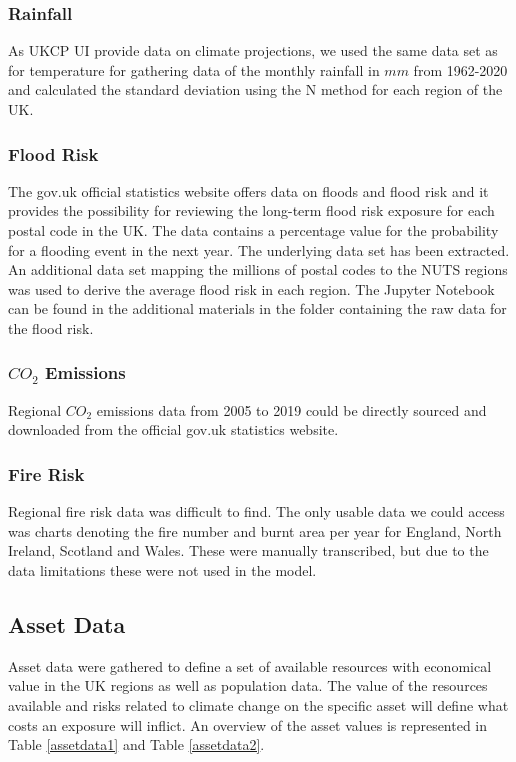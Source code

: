 \documentclass[10pt,a4paper]{article}
\begin{document}
\subsubsection{Rainfall}
As UKCP UI provide data on climate projections, we used the same data set as for temperature for gathering data of the monthly rainfall in $mm$ from 1962-2020 and calculated the standard deviation using the N method for each region of the UK. \cite{uk}
\subsubsection{Flood Risk}
The gov.uk official statistics website offers data on floods and flood risk and it provides the possibility for reviewing the long-term flood risk exposure for each postal code in the UK. The data contains a percentage value for the probability for a flooding event in the next year. The underlying data set has been extracted. An additional data set mapping the millions of postal codes to the NUTS regions was used to derive the average flood risk in each region. The Jupyter Notebook can be found in the additional materials in the folder containing the raw data for the flood risk. \cite{open,postcode}
\subsubsection{$CO_2$ Emissions}
Regional $CO_2$ emissions data from 2005 to 2019 could be directly sourced and downloaded from the official gov.uk statistics website. \cite{uk,ukc}
\subsubsection{Fire Risk}
Regional fire risk data was difficult to find. The only usable data we could access was charts denoting the fire number and burnt area per year for England, North Ireland, Scotland and Wales. These were manually transcribed, but due to the data limitations these were not used in the model. \cite{countryprofile}


\subsection{Asset Data}
Asset data were gathered to define a set of available resources with economical value in the UK regions as well as population data. The value of the resources available and risks related to climate change on the specific asset will define what costs an exposure will inflict. An overview of the asset values is represented in Table \ref{assetdata1} and Table \ref{assetdata2}.
\end{document}
